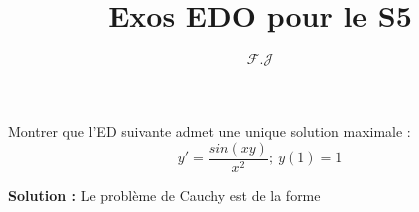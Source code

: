 \documentclass[12pt,a4paper]{article}
\title{Exos EDO pour le S5}
\author{$\mathcal{F.J}$}
\def\be{\begin{exo}}
\def\ee{\end{exo}}
\newcommand{\solution}[1]{\par\noindent\textbf{\color{OliveGreen}Solution :} \textcolor{OliveGreen}{#1}}
\begin{document}
\maketitle
\be
Montrer que l'ED suivante admet une unique solution maximale :
$$y' = \frac{sin(xy)}{x^2} ; ~ y(1) = 1$$
\solution{Le problème de Cauchy est de la forme 
}
\ee
\end{document}
